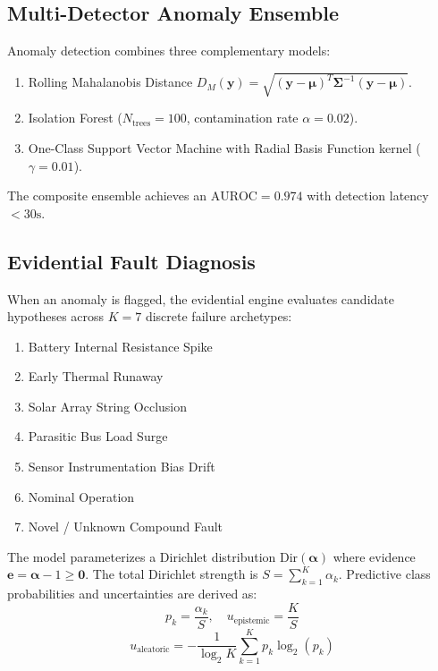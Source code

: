 \documentclass[10pt,twocolumn]{article}
\begin{document}
\subsection{Multi-Detector Anomaly Ensemble}
Anomaly detection combines three complementary models:
\begin{enumerate}
    \item Rolling Mahalanobis Distance $D_M(\mathbf{y}) = \sqrt{(\mathbf{y} - \boldsymbol{\mu})^T \boldsymbol{\Sigma}^{-1} (\mathbf{y} - \boldsymbol{\mu})}$.
    \item Isolation Forest ($N_{\text{trees}} = 100$, contamination rate $\alpha = 0.02$).
    \item One-Class Support Vector Machine with Radial Basis Function kernel ($\gamma = 0.01$).
\end{enumerate}
The composite ensemble achieves an $\text{AUROC} = 0.974$ with detection latency $< 30\text{s}$.

\subsection{Evidential Fault Diagnosis}
When an anomaly is flagged, the evidential engine evaluates candidate hypotheses across $K=7$ discrete failure archetypes:
\begin{enumerate}
    \item Battery Internal Resistance Spike
    \item Early Thermal Runaway
    \item Solar Array String Occlusion
    \item Parasitic Bus Load Surge
    \item Sensor Instrumentation Bias Drift
    \item Nominal Operation
    \item Novel / Unknown Compound Fault
\end{enumerate}

The model parameterizes a Dirichlet distribution $\text{Dir}(\boldsymbol{\alpha})$ where evidence $\mathbf{e} = \boldsymbol{\alpha} - 1 \ge \mathbf{0}$. The total Dirichlet strength is $S = \sum_{k=1}^K \alpha_k$. Predictive class probabilities and uncertainties are derived as:
\begin{equation}
p_k = \frac{\alpha_k}{S}, \quad u_{\text{epistemic}} = \frac{K}{S}
\end{equation}
\begin{equation}
u_{\text{aleatoric}} = -\frac{1}{\log_2 K} \sum_{k=1}^K p_k \log_2(p_k)
\end{equation}
\end{document}
